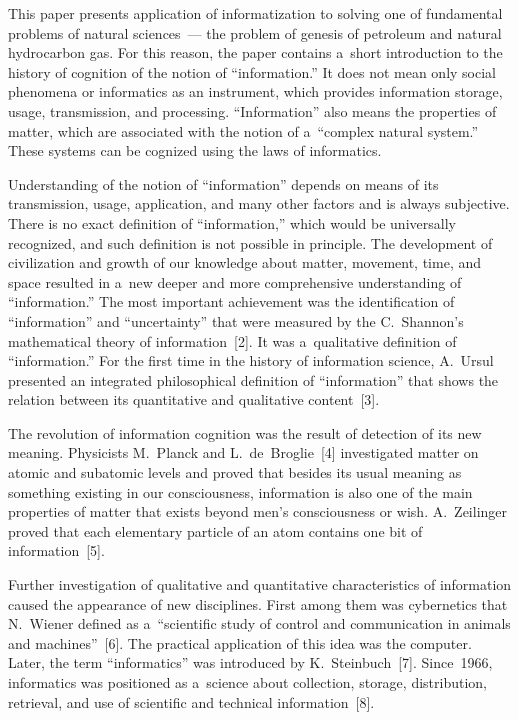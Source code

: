 \begin{multicols}{2}
   This paper presents application of informatization to solving one of 
fundamental problems of natural sciences~--- the problem of genesis of petroleum 
and natural hydrocarbon gas. For this reason, the paper contains a~short introduction 
to the history of cognition of the notion of ``information.'' It does not mean only 
social phenomena or informatics as an instrument, which provides information 
storage, usage, transmission, and processing. ``Information'' also means the 
properties of matter, which are associated with the notion of a~``complex natural 
system.'' These systems can be cognized using the laws of informatics.
   
   Understanding of the notion of ``information'' depends on means of its 
transmission, usage, application, and many other factors and is always subjective. 
There is no exact definition of ``information,'' which would be universally 
recognized, and such definition is not possible in principle. The development of 
civilization and growth of our knowledge about matter, movement, time, and space 
resulted in a~new deeper and more comprehensive understanding of ``information.'' 
The most important achievement was the identification of ``information'' and 
``uncertainty'' that were measured by the C.~Shannon's mathematical theory of 
information~[2]. It was a~qualitative definition of ``information.'' For the first time 
in the history of information science, A.~Ursul presented an integrated 
philosophical definition of ``information'' that shows the relation between its 
quantitative and qualitative content~[3].
   
   The revolution of information cognition was the result of detection of its new 
meaning. Physicists M.~Planck and L.~de~Broglie~[4] investigated matter on 
atomic and subatomic levels and proved that besides its usual meaning as 
something existing in our consciousness, information is also one of the main 
properties of matter that exists beyond men's consciousness or wish. A.~Zeilinger 
proved that each elementary particle of an atom contains one bit of 
information~[5]. 
   
   Further investigation of qualitative and quantitative characteristics of 
information caused the appearance of new disciplines. First among them was 
cybernetics that N.~Wiener defined as a~``scientific study of control and 
communication in animals and machines''~[6]. The practical application of this 
idea was the computer. Later, the term ``informatics'' was introduced by 
K.~Steinbuch~[7]. Since~1966, informatics was positioned as a~science about 
collection, storage, distribution, retrieval, and use of scientific and technical 
information~[8].
    

\end{multicols}

